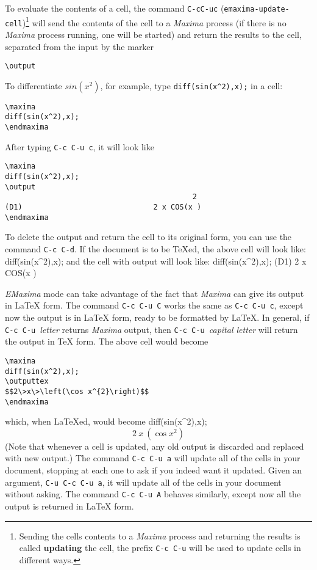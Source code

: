 \documentclass{article}
\newcommand{\emx}{\textsl{\sffamily EMaxima}}
\newcommand{\mx}{\textsl{\sffamily Maxima}}
\begin{document}
\noindent
To evaluate the contents of a cell, the command
\texttt{C-cC-uc} (\texttt{emaxima-update-cell})\footnote{Sending the
  cells contents to a \mx{} process and returning the results is
  called \textbf{updating} the cell, the prefix 
\texttt{C-c C-u} will be used to update cells in different ways.} 
will send the contents
of the cell to a \mx{} process (if there is no \mx{} process running,
one will be started) and return the results to the cell,
separated from the input by the marker
\begin{verbatim}
\output
\end{verbatim}
\noindent
To differentiate
$sin(x^2)$, for example, type 
\texttt{diff(sin(x\^{}2),x);} in a cell:
\begin{verbatim}
\maxima
diff(sin(x^2),x);
\endmaxima
\end{verbatim}
\noindent
After typing \texttt{C-c C-u c}, it will look like
\begin{verbatim}
\maxima
diff(sin(x^2),x);
\output
                                           2
(D1)                              2 x COS(x )
\endmaxima
\end{verbatim}
\noindent
To delete the output and return the cell to its original form, you can
use the command \texttt{C-c C-d}.
If the document is to be \TeX{}ed, the above cell will look like:
\maxima
diff(sin(x^2),x);
\endmaxima
and the cell with output will look like:
\maxima
diff(sin(x^2),x);
(D1)                              2 x COS(x )
\endmaxima

\emx{} mode can take advantage of the fact that \mx{} can give its
output in \LaTeX{} form.  The command \texttt{C-c C-u C}
works the same as \texttt{C-c C-u c}, except now the output is in \LaTeX{}
form, ready to be formatted by \LaTeX{}.  In general, if 
\texttt{C-c C-u }\textsl{letter} returns \mx{} output, then
\texttt{C-c C-u }\textsl{capital letter} will return the output in
\TeX{} form.  The above cell would become
\begin{verbatim}
\maxima
diff(sin(x^2),x);
\outputtex
$$2\>x\>\left(\cos x^{2}\right)$$
\endmaxima
\end{verbatim}
\noindent
which, when \LaTeX{}ed, would become
\maxima
diff(sin(x^2),x);
\outputtex
$$2\>x\>\left(\cos x^{2}\right)$$
\endmaxima
\noindent
(Note that whenever a cell is updated, any old output is discarded and
replaced with new output.)  The command \texttt{C-c C-u a} will update all
of the cells in your document, 
stopping at each one to ask if you indeed want it updated.  Given an
argument, \texttt{C-u C-c C-u a}, it will update all of the cells in your
document without asking.  The command \texttt{C-c C-u A} behaves
similarly, except now all the output is returned in \LaTeX{}  form.
\end{document}
